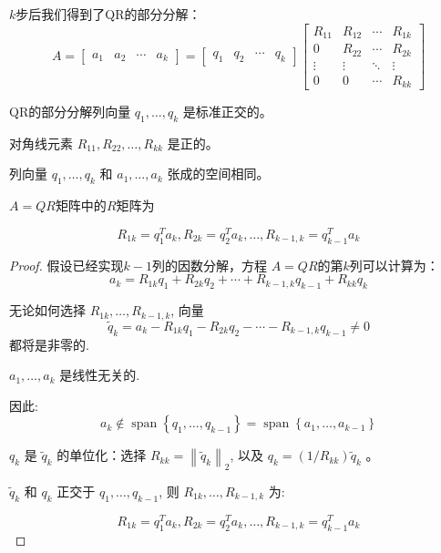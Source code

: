 $k$步后我们得到了QR的部分分解：
$$
A=\left[\begin{array}{llll}
a_{1} & a_{2} & \cdots & a_{k}
\end{array}\right]=\left[\begin{array}{llll}
q_{1} & q_{2} & \cdots & q_{k}
\end{array}\right]\left[\begin{array}{cccc}
R_{11} & R_{12} & \cdots & R_{1 k} \\
0 & R_{22} & \cdots & R_{2 k} \\
\vdots & \vdots & \ddots & \vdots \\
0 & 0 & \cdots & R_{k k}
\end{array}\right]
$$

\begin{corollary}
    QR的部分分解列向量 $q_{1}, \ldots, q_{k}$ 是标准正交的。
\end{corollary}

\begin{corollary}
    对角线元素 $R_{11}, R_{22}, \ldots, R_{k k}$ 是正的。
\end{corollary}

\begin{corollary}
    列向量 $q_{1}, \ldots, q_{k}$ 和 $a_{1}, \ldots, a_{k}$ 张成的空间相同。
\end{corollary}

\begin{theorem}
$A = Q R$矩阵中的$R$矩阵为

    $$R_{1 k}=q_{1}^{T} a_{k},  R_{2 k}=q_{2}^{T} a_{k}, \ldots,  R_{k-1, k}=q_{k-1}^{T} a_{k}$$
\end{theorem}

\begin{proof}


    假设已经实现$k−1$列的因数分解，方程 $A= QR$的第$k$列可以计算为：
$$
a_{k}=R_{1 k} q_{1}+R_{2 k} q_{2}+\cdots+R_{k-1, k} q_{k-1}+R_{k k} q_{k}
$$

无论如何选择 $R_{1 k}, \ldots, R_{k-1, k}$, 向量
$$
\tilde{q}_{k}=a_{k}-R_{1 k} q_{1}-R_{2 k} q_{2}-\cdots-R_{k-1, k} q_{k-1} \neq 0
$$
都将是非零的.

$a_{1}, \ldots, a_{k}$ 是线性无关的.

因此:
$$
a_{k} \notin \operatorname{span}\left\{q_{1}, \ldots, q_{k-1}\right\}=\operatorname{span}\left\{a_{1}, \ldots, a_{k-1}\right\}
$$

$q_{k}$ 是 $\tilde{q}_{k}$ 的单位化：选择 $R_{k k}=\left\|\tilde{q}_{k}\right\|_{2}$, 以及 $q_{k}=\left(1 / R_{k k}\right) \tilde{q}_{k}$ 。 

$\tilde{q}_{k}$ 和 $q_{k}$ 正交于 $q_{1}, \ldots, q_{k-1}$, 则 $R_{1 k}, \ldots, R_{k-1, k}$ 为:

$$R_{1 k}=q_{1}^{T} a_{k},  R_{2 k}=q_{2}^{T} a_{k}, \ldots,  R_{k-1, k}=q_{k-1}^{T} a_{k}$$
\end{proof}


